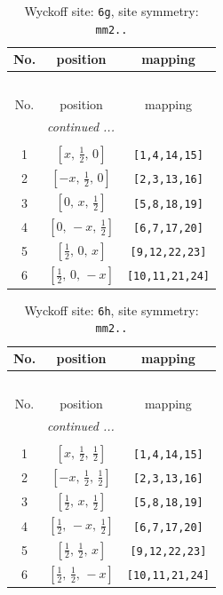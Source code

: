 \documentclass[fleqn,8pt]{jsarticle}
\begin{document}
\renewcommand{\arraystretch}{1.2}
\begin{longtable}{ccc}
\caption{Wyckoff site: {\tt 6g}, site symmetry: {\tt mm2..}}
 \\
 \hline \hline
No. & position & mapping \\ \hline \endfirsthead

\multicolumn{2}{l}{\tablename\ \thetable{}} \\
 \hline \hline
No. & position & mapping \\ \hline \endhead

 \hline \hline
\multicolumn{2}{r}{\footnotesize\it continued ...} \\ \endfoot

 \hline \hline
\multicolumn{2}{r}{} \\ \endlastfoot

1 & $\left[ x,\, \frac{1}{2},\, 0 \right]$ & {\tt [1,4,14,15]} \\ \hline
2 & $\left[ - x,\, \frac{1}{2},\, 0 \right]$ & {\tt [2,3,13,16]} \\ \hline
3 & $\left[ 0,\, x,\, \frac{1}{2} \right]$ & {\tt [5,8,18,19]} \\ \hline
4 & $\left[ 0,\, - x,\, \frac{1}{2} \right]$ & {\tt [6,7,17,20]} \\ \hline
5 & $\left[ \frac{1}{2},\, 0,\, x \right]$ & {\tt [9,12,22,23]} \\ \hline
6 & $\left[ \frac{1}{2},\, 0,\, - x \right]$ & {\tt [10,11,21,24]} \\
\end{longtable}
\renewcommand{\arraystretch}{1.2}
\begin{longtable}{ccc}
\caption{Wyckoff site: {\tt 6h}, site symmetry: {\tt mm2..}}
 \\
 \hline \hline
No. & position & mapping \\ \hline \endfirsthead

\multicolumn{2}{l}{\tablename\ \thetable{}} \\
 \hline \hline
No. & position & mapping \\ \hline \endhead

 \hline \hline
\multicolumn{2}{r}{\footnotesize\it continued ...} \\ \endfoot

 \hline \hline
\multicolumn{2}{r}{} \\ \endlastfoot

1 & $\left[ x,\, \frac{1}{2},\, \frac{1}{2} \right]$ & {\tt [1,4,14,15]} \\ \hline
2 & $\left[ - x,\, \frac{1}{2},\, \frac{1}{2} \right]$ & {\tt [2,3,13,16]} \\ \hline
3 & $\left[ \frac{1}{2},\, x,\, \frac{1}{2} \right]$ & {\tt [5,8,18,19]} \\ \hline
4 & $\left[ \frac{1}{2},\, - x,\, \frac{1}{2} \right]$ & {\tt [6,7,17,20]} \\ \hline
5 & $\left[ \frac{1}{2},\, \frac{1}{2},\, x \right]$ & {\tt [9,12,22,23]} \\ \hline
6 & $\left[ \frac{1}{2},\, \frac{1}{2},\, - x \right]$ & {\tt [10,11,21,24]} \\
\end{longtable}
\end{document}
